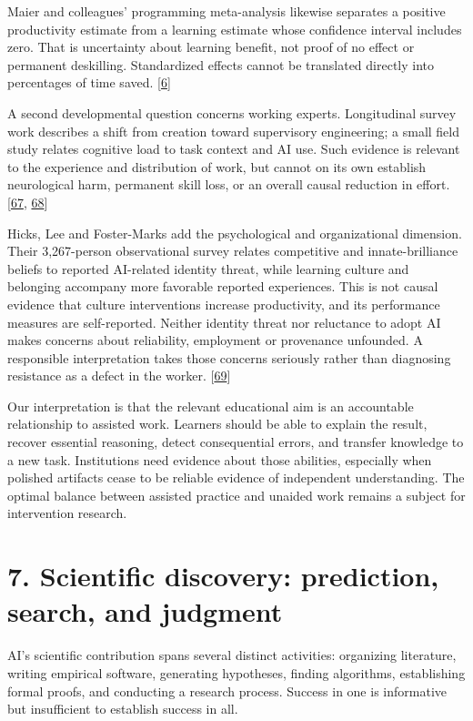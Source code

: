 Maier and colleagues' programming meta-analysis likewise separates a positive productivity estimate from a learning estimate whose confidence interval includes zero. That is uncertainty about learning benefit, not proof of no effect or permanent deskilling. Standardized effects cannot be translated directly into percentages of time saved. [\hyperlink{ref-maier2026}{6}]


A second developmental question concerns working experts. Longitudinal survey work describes a shift from creation toward supervisory engineering; a small field study relates cognitive load to task context and AI use. Such evidence is relevant to the experience and distribution of work, but cannot on its own establish neurological harm, permanent skill loss, or an overall causal reduction in effort. [\hyperlink{ref-vella2026}{67}, \hyperlink{ref-brand2026}{68}]


Hicks, Lee and Foster-Marks add the psychological and organizational dimension. Their 3,267-person observational survey relates competitive and innate-brilliance beliefs to reported AI-related identity threat, while learning culture and belonging accompany more favorable reported experiences. This is not causal evidence that culture interventions increase productivity, and its performance measures are self-reported. Neither identity threat nor reluctance to adopt AI makes concerns about reliability, employment or provenance unfounded. A responsible interpretation takes those concerns seriously rather than diagnosing resistance as a defect in the worker. [\hyperlink{ref-ref-47ac0a3015}{69}]


Our interpretation is that the relevant educational aim is an accountable relationship to assisted work. Learners should be able to explain the result, recover essential reasoning, detect consequential errors, and transfer knowledge to a new task. Institutions need evidence about those abilities, especially when polished artifacts cease to be reliable evidence of independent understanding. The optimal balance between assisted practice and unaided work remains a subject for intervention research.



\section*{7. Scientific discovery: prediction, search, and judgment}
AI's scientific contribution spans several distinct activities: organizing literature, writing empirical software, generating hypotheses, finding algorithms, establishing formal proofs, and conducting a research process. Success in one is informative but insufficient to establish success in all.


